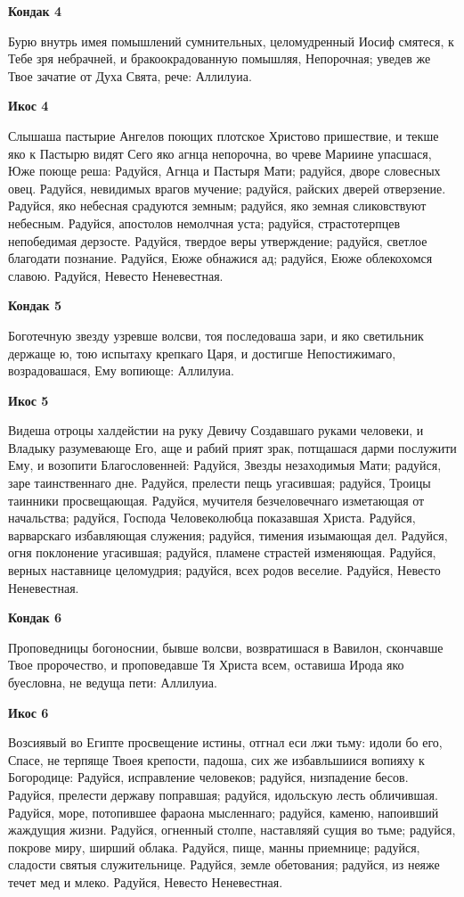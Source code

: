 \bfseries Кондак 4\normalfont{}\nopagebreak


Бурю внутрь имея помышлений сумнительных, целомудренный Иосиф смятеся, к Тебе зря небрачней, и бракоокрадованную помышляя, Непорочная; уведев же Твое зачатие от Духа Свята, рече: Аллилуиа.


\bfseries Икос 4\normalfont{}\nopagebreak


Слышаша пастырие Ангелов поющих плотское Христово пришествие, и текше яко к Пастырю видят Сего яко агнца непорочна, во чреве Мариине упасшася, Юже поюще реша: Радуйся, Агнца и Пастыря Мати; радуйся, дворе словесных овец. Радуйся, невидимых врагов мучение; радуйся, райских дверей отверзение. Радуйся, яко небесная срадуются земным; радуйся, яко земная сликовствуют небесным. Радуйся, апостолов немолчная уста; радуйся, страстотерпцев непобедимая дерзосте. Радуйся, твердое веры утверждение; радуйся, светлое благодати познание. Радуйся, Еюже обнажися ад; радуйся, Еюже облекохомся славою. Радуйся, Невесто Неневестная.


\bfseries Кондак 5\normalfont{}\nopagebreak


Боготечную звезду узревше волсви, тоя последоваша зари, и яко светильник держаще ю, тою испытаху крепкаго Царя, и достигше Непостижимаго, возрадовашася, Ему вопиюще: Аллилуиа.


\bfseries Икос 5\normalfont{}\nopagebreak


Видеша отроцы халдейстии на руку Девичу Создавшаго руками человеки, и Владыку разумевающе Его, аще и рабий прият зрак, потщашася дарми послужити Ему, и возопити Благословенней: Радуйся, Звезды незаходимыя Мати; радуйся, заре таинственнаго дне. Радуйся, прелести пещь угасившая; радуйся, Троицы таинники просвещающая. Радуйся, мучителя безчеловечнаго изметающая от начальства; радуйся, Господа Человеколюбца показавшая Христа. Радуйся, варварскаго избавляющая служения; радуйся, тимения изымающая дел. Радуйся, огня поклонение угасившая; радуйся, пламене страстей изменяющая. Радуйся, верных наставнице целомудрия; радуйся, всех родов веселие. Радуйся, Невесто Неневестная.


\bfseries Кондак 6\normalfont{}\nopagebreak


Проповедницы богоноснии, бывше волсви, возвратишася в Вавилон, скончавше Твое пророчество, и проповедавше Тя Христа всем, оставиша Ирода яко буесловна, не ведуща пети: Аллилуиа.


\bfseries Икос 6\normalfont{}\nopagebreak


Возсиявый во Египте просвещение истины, отгнал еси лжи тьму: идоли бо его, Спасе, не терпяще Твоея крепости, падоша, сих же избавльшиися вопияху к Богородице: Радуйся, исправление человеков; радуйся, низпадение бесов. Радуйся, прелести державу поправшая; радуйся, идольскую лесть обличившая. Радуйся, море, потопившее фараона мысленнаго; радуйся, каменю, напоивший жаждущия жизни. Радуйся, огненный столпе, наставляяй сущия во тьме; радуйся, покрове миру, ширший облака. Радуйся, пище, манны приемнице; радуйся, сладости святыя служительнице. Радуйся, земле обетования; радуйся, из неяже течет мед и млеко. Радуйся, Невесто Неневестная.


